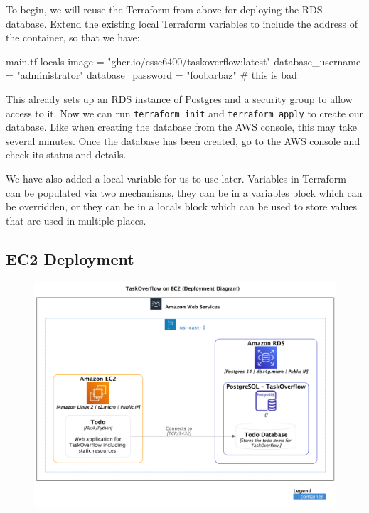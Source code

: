 \documentclass{csse4400}
\begin{document}
To begin, we will reuse the Terraform from above for deploying the RDS database.
Extend the existing local Terraform variables to include the address of the container, so that we have:

\begin{code}[language=terraform,numbers=none]{main.tf}
locals {
  image             = "ghcr.io/csse6400/taskoverflow:latest"
  database_username = "administrator"
  database_password = "foobarbaz" # this is bad
}
\end{code}

This already sets up an RDS instance of Postgres and a security group to allow access to it.
Now we can run \texttt{terraform init} and \texttt{terraform apply} to create our database.
Like when creating the database from the AWS console, this may take several minutes.
Once the database has been created, go to the AWS console and check its status and details.

We have also added a local variable for us to use later.
Variables in Terraform can be populated via two mechanisms,
they can be in a variables block which can be overridden,
or they can be in a locals block which can be used to store values that are used in multiple places.

\subsection{EC2 Deployment}


\begin{figure}[H]
  \includegraphics[trim=0 230 0 0,clip,width=\textwidth]{diagrams/ec2deployment}
\end{figure}
\end{document}

